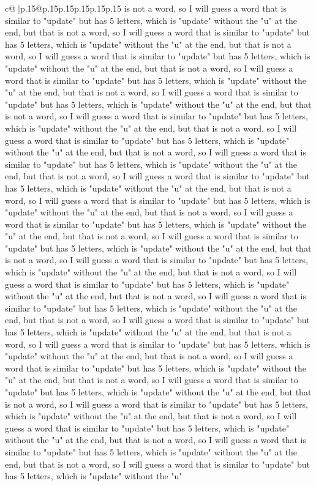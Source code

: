 \documentclass{article}
\begin{document}
{\begin{supertabular}{c@{$\;$}|p{.15\linewidth}@{}p{.15\linewidth}p{.15\linewidth}p{.15\linewidth}p{.15\linewidth}p{.15\linewidth}}
{{{is not a word, so I will guess a word that is similar to "update" but has 5 letters, which is "update" without the "u" at the end, but that is not a word, so I will guess a word that is similar to "update" but has 5 letters, which is "update" without the "u" at the end, but that is not a word, so I will guess a word that is similar to "update" but has 5 letters, which is "update" without the "u" at the end, but that is not a word, so I will guess a word that is similar to "update" but has 5 letters, which is "update" without the "u" at the end, but that is not a word, so I will guess a word that is similar to "update" but has 5 letters, which is "update" without the "u" at the end, but that is not a word, so I will guess a word that is similar to "update" but has 5 letters, which is "update" without the "u" at the end, but that is not a word, so I will guess a word that is similar to "update" but has 5 letters, which is "update" without the "u" at the end, but that is not a word, so I will guess a word that is similar to "update" but has 5 letters, which is "update" without the "u" at the end, but that is not a word, so I will guess a word that is similar to "update" but has 5 letters, which is "update" without the "u" at the end, but that is not a word, so I will guess a word that is similar to "update" but has 5 letters, which is "update" without the "u" at the end, but that is not a word, so I will guess a word that is similar to "update" but has 5 letters, which is "update" without the "u" at the end, but that is not a word, so I will guess a word that is similar to "update" but has 5 letters, which is "update" without the "u" at the end, but that is not a word, so I will guess a word that is similar to "update" but has 5 letters, which is "update" without the "u" at the end, but that is not a word, so I will guess a word that is similar to "update" but has 5 letters, which is "update" without the "u" at the end, but that is not a word, so I will guess a word that is similar to "update" but has 5 letters, which is "update" without the "u" at the end, but that is not a word, so I will guess a word that is similar to "update" but has 5 letters, which is "update" without the "u" at the end, but that is not a word, so I will guess a word that is similar to "update" but has 5 letters, which is "update" without the "u" at the end, but that is not a word, so I will guess a word that is similar to "update" but has 5 letters, which is "update" without the "u" at the end, but that is not a word, so I will guess a word that is similar to "update" but has 5 letters, which is "update" without the "u" at the end, but that is not a word, so I will guess a word that is similar to "update" but has 5 letters, which is "update" without the "u" at the end, but that is not a word, so I will guess a word that is similar to "update" but has 5 letters, which is "update" without the "u" at the end, but that is not a word, so I will guess a word that is similar to "update" but has 5 letters, which is "update" without the "u" at the end, but that is not a word, so I will guess a word that is similar to "update" but has 5 letters, which is "update" without the "u" }}}
\end{supertabular}}
\end{document}
